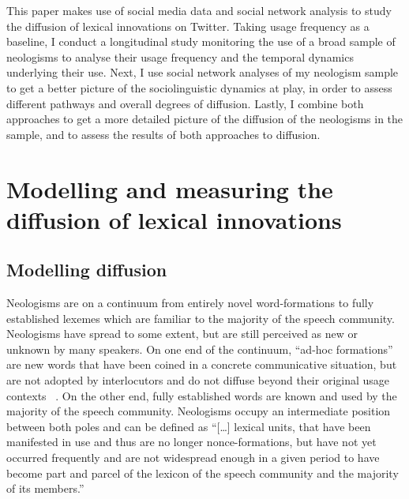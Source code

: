 \documentclass[
  a4paper,
  abstract=on,
  captions=tableabove,
  ]{scrartcl}
\begin{document}
  This paper makes use of social media data and social network analysis to study the diffusion of lexical innovations on Twitter. Taking usage frequency as a baseline, I conduct a longitudinal study monitoring the use of a broad sample of neologisms to analyse their usage frequency and the temporal dynamics underlying their use. Next, I use social network analyses of my neologism sample to get a better picture of the sociolinguistic dynamics at play, in order to assess different pathways and overall degrees of diffusion. Lastly, I combine both approaches to get a more detailed picture of the diffusion of the neologisms in the sample, and to assess the results of both approaches to diffusion.



\section{Modelling and measuring the diffusion of lexical innovations}
  \label{sec:model-measure-diff}


  \subsection{Modelling diffusion}

    Neologisms are on a continuum from entirely novel word-formations to fully established lexemes which are familiar to the majority of the speech community. Neologisms have spread to some extent, but are still perceived as new or unknown by many speakers. On one end of the continuum, \enquote{ad-hoc formations} are new words that have been coined in a concrete communicative situation, but are not adopted by interlocutors and do not diffuse beyond their original usage contexts~ \parencite{Hohenhaus1996AdhocWortbildungTerminologie}. On the other end, fully established words are known and used by the majority of the speech community. Neologisms occupy an intermediate position between both poles and can be defined as \enquote{[\dots] lexical units, that have been manifested in use and thus are no longer nonce-formations, but have not yet occurred frequently and are not widespread enough in a given period to have become part and parcel of the lexicon of the speech community and the majority of its members.}~\parencite[31]{Kerremans2015WebNew}
\end{document}
